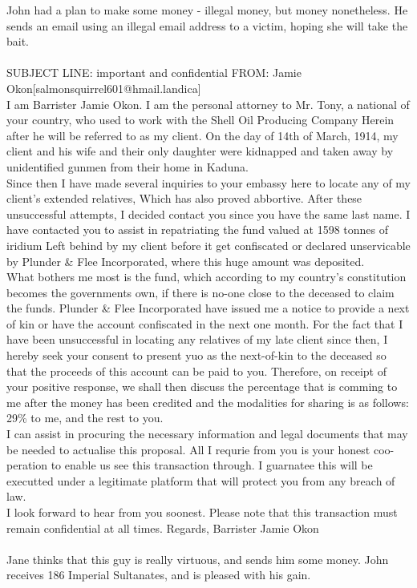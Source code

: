 \documentclass{article}
\begin{document}
John had a plan to make some money {-} illegal money, but money nonetheless.
He sends an email using an illegal email address to a victim, hoping she will take the bait.
\\\\
SUBJECT LINE: important and confidential
FROM: Jamie Okon[salmonsquirrel601@hmail.landica]
\\
I am Barrister Jamie Okon.
I am the personal attorney to Mr. Tony, a national of your country, who used to work with the Shell Oil Producing Company
Herein after he will be referred to as my client.
On the day of 14th of March, 1914, my client and his wife and their only daughter were kidnapped and taken away by unidentified gunmen from their home in Kaduna.
\\
Since then I have made several inquiries to your embassy here to locate any of my client's extended relatives, Which has also proved abbortive.
After these unsuccessful attempts, I decided contact you since you have the same last name.
I have contacted you to assist in repatriating the fund valued at 1598 tonnes of iridium Left behind by my client before it get confiscated or declared unservicable by Plunder \& Flee Incorporated, where this huge amount was deposited.
\\
What bothers me most is the fund, which according to my country's constitution becomes the governments own, if there is no{-}one close to the deceased to claim the funds.
Plunder \& Flee Incorporated have issued me a notice to provide a next of kin or have the account confiscated in the next one month.
For the fact that I have been unsuccessful in locating any relatives of my late client since then, I hereby seek your consent to present yuo as the next{-}of{-}kin to the deceased so that the proceeds of this account can be paid to you.
Therefore, on receipt of your positive response, we shall then discuss the percentage that is comming to me after the money has been credited and the modalities for sharing is as follows: 29\% to me, and the rest to you.
\\
I can assist in procuring the necessary information and legal documents that may be needed to actualise this proposal.
All I requrie from you is your honest coo{-}peration to enable us see this transaction through.
I guarnatee this will be executted under a legitimate platform that will protect you from any breach of law.
\\
I look forward to hear from you soonest.
Please note that this transaction must remain confidential at all times.
Regards, Barrister Jamie Okon
\\\\
Jane thinks that this guy is really virtuous, and sends him some money.
John receives 186 Imperial Sultanates, and is pleased with his gain.
\end{document}
